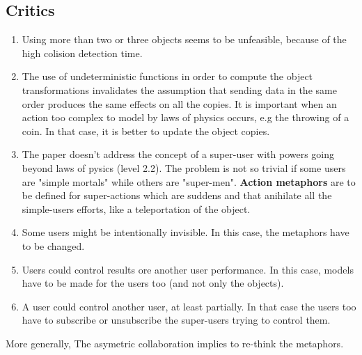 \documentclass[a4paper]{article}
\begin{document}
\subsection{Critics}
\begin{enumerate}
	\item Using more than two or three objects seems to be unfeasible, because of the high colision detection time.
	\item The use of undeterministic functions in order to compute the object transformations invalidates the assumption that sending data in the same order produces the same effects on all the copies. It is important when an action too complex to model by laws of physics occurs, e.g the throwing of a coin. In that case, it is better to update the object copies.
	\item The paper doesn't address the concept of a super-user with powers going beyond laws of pysics (level 2.2). The problem is not so trivial if some users are "simple mortals" while others are "super-men". \textbf{Action metaphors} are to be defined for super-actions which are suddens and that anihilate all the simple-users efforts, like a teleportation of the object.
	\item Some users might be intentionally invisible. In this case, the metaphors have to be changed.
	\item Users could control results ore another user performance. In this case, models have to be made for the users too (and not only the objects).
	\item A user could control another user, at least partially. In that case the users too have to subscribe or unsubscribe the super-users trying to control them.
\end{enumerate}
More generally, The asymetric collaboration implies to re-think the metaphors.
\end{document}
